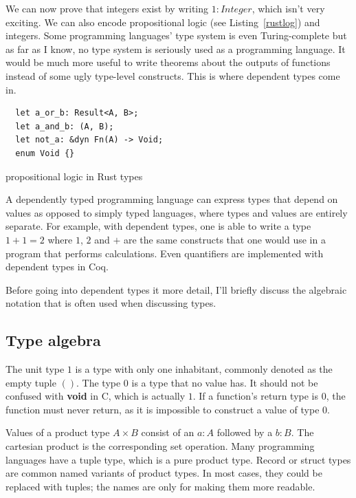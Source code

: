 \documentclass[english, 12pt, a4paper, sci, a-1b, online]{aaltothesis}
\begin{document}
We can now prove that integers exist by writing $1: Integer$, which isn't very exciting. We can also encode propositional logic (see Listing~\ref{rustlog}) and integers. Some programming languages' type system is even Turing-complete but as far as I know, no type system is seriously used as a programming language. It would be much more useful to write theorems about the outputs of functions instead of some ugly type-level constructs. This is where dependent types come in.

\begin{listing}[h]
  \begin{verbatim}
  let a_or_b: Result<A, B>;
  let a_and_b: (A, B);
  let not_a: &dyn Fn(A) -> Void;
  enum Void {}
  \end{verbatim}
  \caption{propositional logic in Rust types}
  \label{rustlog}
\end{listing}

A dependently typed programming language can express types that depend on values as opposed to simply typed languages, where types and values are entirely separate. For example, with dependent types, one is able to write a type $1 + 1 = 2$ where $1$, $2$ and $+$ are the same constructs that one would use in a program that performs calculations. Even quantifiers are implemented with dependent types in Coq.

Before going into dependent types it more detail, I'll briefly discuss the algebraic notation that is often used when discussing types.

\subsection{Type algebra}

The unit type $1$ is a type with only one inhabitant, commonly denoted as the empty tuple $()$. The type $0$ is a type that no value has. It should not be confused with \textbf{void} in C, which is actually $1$. If a function's return type is $0$, the function must never return, as it is impossible to construct a value of type $0$.

Values of a product type $A \times B$ consist of an $a : A$ followed by a $b : B$. The cartesian product is the corresponding set operation. Many programming languages have a tuple type, which is a pure product type. Record or struct types are common named variants of product types. In most cases, they could be replaced with tuples; the names are only for making them more readable.
\end{document}
